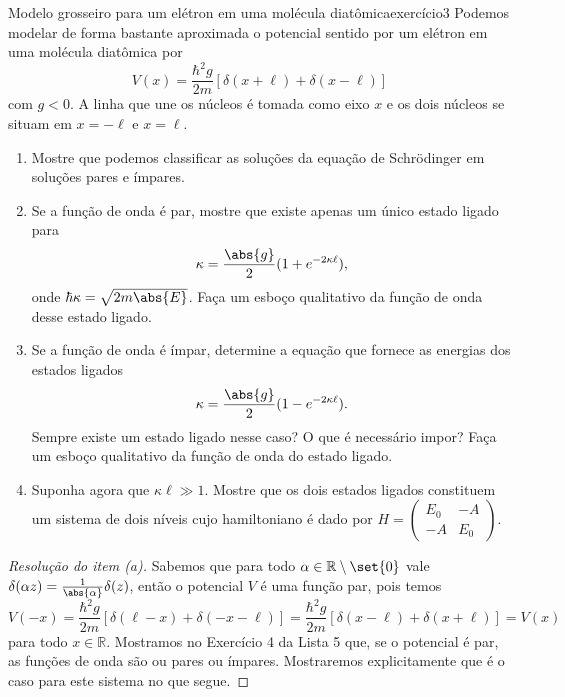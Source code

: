 \begin{exercício}{Modelo grosseiro para um elétron em uma molécula diatômica}{exercício3}
    Podemos modelar de forma bastante aproximada o potencial sentido por um elétron em uma molécula diatômica por
    \begin{equation*}
        V(x) = \frac{\hbar^2 g}{2m}\left[\delta(x + \ell) + \delta(x - \ell)\right]
    \end{equation*}
    com \(g < 0\). A linha que une os núcleos é tomada como eixo \(x\) e os dois núcleos se situam em \(x = -\ell\) e \(x = \ell\).
    \begin{enumerate}[label=(\alph*)]
        \item Mostre que podemos classificar as soluções da equação de Schrödinger em soluções pares e ímpares.
        \item Se a função de onda é par, mostre que existe apenas um único estado ligado para
            \begin{equation*}
                \kappa = \frac{\abs{g}}{2}(1 + e^{-2 \kappa \ell}),
            \end{equation*}
            onde \(\hbar \kappa = \sqrt{2 m \abs{E}}\). Faça um esboço qualitativo da função de onda desse estado ligado.
        \item Se a função de onda é ímpar, determine a equação que fornece as energias dos estados ligados
            \begin{equation*}
                \kappa = \frac{\abs{g}}{2}(1 - e^{-2 \kappa \ell}).
            \end{equation*}
            Sempre existe um estado ligado nesse caso? O que é necessário impor? Faça um esboço qualitativo da função de onda do estado ligado.
        \item Suponha agora que \(\kappa \ell \gg 1\). Mostre que os dois estados ligados constituem um sistema de dois níveis cujo hamiltoniano é dado por \(H = \left(\begin{smallmatrix}
                E_0 & -A\\
                -A & E_0
        \end{smallmatrix}\right)\).
    \end{enumerate}
\end{exercício}
\begin{proof}[Resolução do item (a)]
    Sabemos que para todo \(\alpha \in \mathbb{R}\setminus\set{0}\) vale \(\delta(\alpha z) = \frac{1}{\abs{\alpha}} \delta(z)\), então o potencial \(V\) é uma função par, pois temos
    \begin{equation*}
        V(-x) = \frac{\hbar^2 g}{2m }\left[\delta(\ell - x) + \delta(-x - \ell)\right] = \frac{\hbar^2 g}{2m}\left[\delta(x - \ell) + \delta(x + \ell)\right] = V(x)
    \end{equation*}
    para todo \(x \in \mathbb{R}\). Mostramos no Exercício 4 da Lista 5 que, se o potencial é par, as funções de onda são ou pares ou ímpares. Mostraremos explicitamente que é o caso para este sistema no que segue.
\end{proof}
